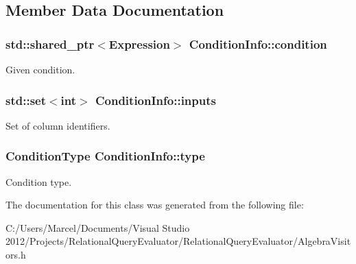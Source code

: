 \subsection{Member Data Documentation}
\hypertarget{class_condition_info_a57923bd70f56a79ca3ae8d09bb14f550}{
\subsubsection[{condition}]{\setlength{\rightskip}{0pt plus 5cm}std\+::shared\+\_\+ptr$<${\bf Expression}$>$ Condition\+Info\+::condition}}\label{class_condition_info_a57923bd70f56a79ca3ae8d09bb14f550}
Given condition. \hypertarget{class_condition_info_ab800ad40c4040827cd93acc048863213}{
\subsubsection[{inputs}]{\setlength{\rightskip}{0pt plus 5cm}std\+::set$<$int$>$ Condition\+Info\+::inputs}}\label{class_condition_info_ab800ad40c4040827cd93acc048863213}
Set of column identifiers. \hypertarget{class_condition_info_a8ceacc67eb6d52679a9541764fd8b7d6}{
\subsubsection[{type}]{\setlength{\rightskip}{0pt plus 5cm}Condition\+Type Condition\+Info\+::type}}\label{class_condition_info_a8ceacc67eb6d52679a9541764fd8b7d6}
Condition type. 

The documentation for this class was generated from the following file\+:\begin{DoxyCompactItemize}
\item 
C\+:/\+Users/\+Marcel/\+Documents/\+Visual Studio 2012/\+Projects/\+Relational\+Query\+Evaluator/\+Relational\+Query\+Evaluator/Algebra\+Visitors.\+h\end{DoxyCompactItemize}
